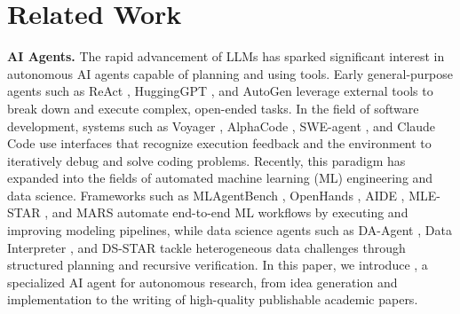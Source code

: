\section{Related Work}

\noindent\textbf{AI Agents.} The rapid advancement of LLMs has sparked significant interest in autonomous AI agents capable of planning and using tools. Early general-purpose agents such as ReAct \citep{yao2022react}, HuggingGPT \citep{shen2023hugginggpt}, and AutoGen \citep{wu2024autogen} leverage external tools to break down and execute complex, open-ended tasks. In the field of software development, systems such as Voyager \citep{wang2023voyager}, AlphaCode \citep{li2022competition}, SWE-agent \citep{yang2024swe}, and Claude Code \citep{liu2026dive} use interfaces that recognize execution feedback and the environment to iteratively debug and solve coding problems. Recently, this paradigm has expanded into the fields of automated machine learning (ML) engineering and data science. Frameworks such as MLAgentBench \citep{huang2023mlagentbench}, OpenHands \citep{wang2025openhands}, AIDE \citep{jiang2025aide}, MLE-STAR \citep{nam2026mle}, and MARS \citep{chen2026mars} automate end-to-end ML workflows by executing and improving modeling pipelines, while data science agents such as DA-Agent \citep{huang2024code}, Data Interpreter \citep{hong2025data}, and DS-STAR \citep{nam2026ds} tackle heterogeneous data challenges through structured planning and recursive verification. In this paper, we introduce \sname, a specialized AI agent for autonomous research, from idea generation and implementation to the writing of high-quality publishable academic papers.

